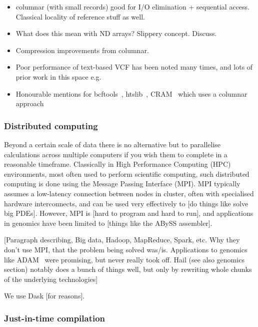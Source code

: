 \documentclass[9pt,lineno]{elife}
\begin{document}
\begin{itemize}
\item columnar (with small records) good for I/O elimination + sequential access.
Classical locality of reference stuff as well.
\item What does this mean with ND arrays? Slippery concept. Discuss.
\item Compression improvements from columnar.
\item Poor performance of text-based VCF has been noted many times,
and lots of prior work in this space e.g. \citep{kelleher2013processing}
\item Honourable mentions for bcftools~\citep{danecek2021twelve},
htslib~\citep{bonfield2021htslib}, CRAM~\citep{bonfield2014scramble,bonfield2022cram}
which uses a columnar approach
\end{itemize}

\subsubsection{Distributed computing}

Beyond a certain scale of data there is no alternative but to
parallelise calculations across multiple computers if you wish
them to complete in a reasonable timeframe. Classically in
High Performance Computing (HPC) environments, most often used
to perform scientific computing, such distributed computing
is done using the Message Passing Interface (MPI). MPI
typically assumes a low-latency connection between nodes in
cluster, often with specialised hardware interconnects,
and can be used very effectively to [do things like solve big PDEs].
However, MPI is [hard to program and hard to run], and applications
in genomics have been limited to [things like the ABySS assembler].

[Paragraph describing, Big data, Hadoop, MapReduce, Spark, etc. Why
they don't use MPI, that the problem being solved was/is.
Applications to genomics like ADAM~\citep{nothaft2015rethinking} were promising, but never really
took off. Hail (see also genomics section) notably does a
bunch of things well, but only by rewriting whole chunks of the
underlying technologies]

We use Dask [for reasons].

\subsubsection{Just-in-time compilation}
\end{document}
